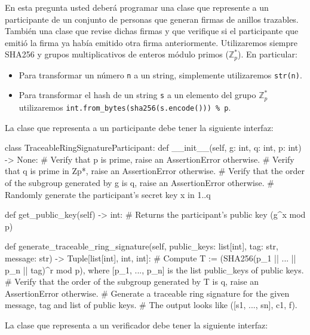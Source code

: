 

\item \text{[2 puntos]} En esta pregunta usted deberá programar una clase que represente a un participante de un conjunto de personas que generan firmas de anillos trazables. También una clase que revise dichas firmas y que verifique si el participante que emitió la firma ya había emitido otra firma anteriormente. Utilizaremos siempre SHA256 y grupos multiplicativos de enteros módulo primos ($\mathbb{Z}_p^*$). En particular:

\begin{itemize}
        \item Para transformar un número \texttt{n} a un string, simplemente utilizaremos \texttt{str(n)}.
        \item Para transformar el hash de un string \texttt{s} a un elemento del grupo $\mathbb{Z}_p^*$ utilizaremos \texttt{int.from\_bytes(sha256(s.encode())) \% p}.
\end{itemize}

La clase que representa a un participante debe tener la siguiente interfaz:

\begin{python}
class TraceableRingSignatureParticipant:
        def __init__(self, g: int, q: int, p: int) -> None:
                # Verify that p is prime, raise an AssertionError otherwise.
                # Verify that q is prime in Zp*, raise an AssertionError otherwise.
                # Verify that the order of the subgroup generated by g is q, raise an AssertionError otherwise.
                # Randomly generate the participant's secret key x in {1..q}

        def get_public_key(self) -> int:
                # Returns the participant's public key (g^x mod p)

        def generate_traceable_ring_signature(self, public_keys: list[int], tag: str, message: str) -> Tuple[list[int], int, int]:
                # Compute T := (SHA256(p_1 || ... || p_n || tag)^r mod p), where [p_1, ..., p_n] is the list public_keys of public keys.
                # Verify that the order of the subgroup generated by T is q, raise an AssertionError otherwise.
                # Generate a traceable ring signature for the given message, tag and list of public keys.
                # The output looks like ([s1, ..., sn], c1, f).

\end{python}

La clase que representa a un verificador debe tener la siguiente interfaz:

